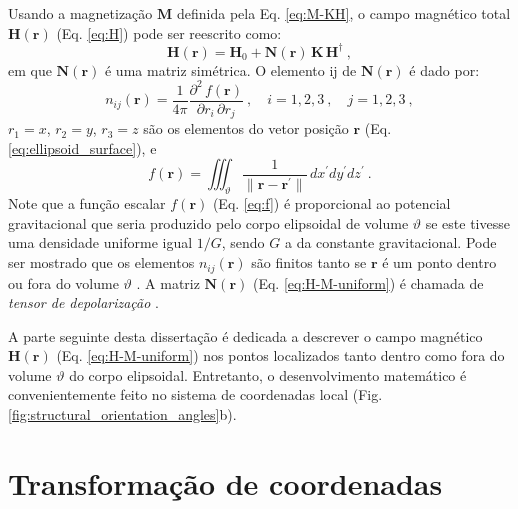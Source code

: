 Usando a magnetização $\mathbf{M}$ definida pela Eq. \ref{eq:M-KH}, o campo magnético total $\mathbf{H}(\mathbf{r})$ (Eq. \ref{eq:H}) pode ser reescrito como:
\begin{equation}
\mathbf{H}(\mathbf{r}) = \mathbf{H}_{0} 
+ \mathbf{N}(\mathbf{r}) \, \mathbf{K} \, \mathbf{H}^{\dagger} \: ,
\label{eq:H-M-uniform}
\end{equation}
em que $\mathbf{N}(\mathbf{r})$ é uma matriz simétrica. O elemento ij de $\mathbf{N}(\mathbf{r})$ é dado por:
\begin{equation}
n_{ij}(\mathbf{r}) = 
\frac{1}{4\pi} \frac{\partial^{2} \, f(\mathbf{r})}
{\partial r_{i} \, \partial r_{j}} 
\: , \quad i = 1, 2, 3 \: , 
\quad j = 1, 2, 3 \: ,
\label{eq:nij}
\end{equation}
$r_{1} = x$, $r_{2} = y$, $r_{3} = z$ são os elementos do vetor posição $\mathbf{r}$ (Eq. \ref{eq:ellipsoid_surface}), 
e
\begin{equation}
f(\mathbf{r}) = \iiint_{\vartheta} 
\frac{1}{\| \mathbf{r} - \mathbf{r}^{\prime} \|}
\, dx^{\prime}dy^{\prime}dz^{\prime} \: .
\label{eq:f}
\end{equation}
Note que a função escalar $f(\mathbf{r})$ (Eq. \ref{eq:f}) é proporcional ao potencial gravitacional que seria produzido pelo corpo elipsoidal de volume $\vartheta$ se este tivesse uma densidade uniforme igual $1/G$, sendo $G$ a da constante gravitacional. Pode ser mostrado que os elementos $n_{ij}(\mathbf{r})$ são finitos tanto se $\mathbf{r}$ é um ponto dentro ou fora do volume $\vartheta$ \citep{peirce1902, webster1904}. A matriz $\mathbf{N}(\mathbf{r})$ (Eq. \ref{eq:H-M-uniform}) é chamada de \textit{tensor de depolarização} \citep{soliverez1981, soliverez2008}.

A parte seguinte desta dissertação é dedicada a descrever o campo magnético $\mathbf{H}(\mathbf{r})$ (Eq. \ref{eq:H-M-uniform}) nos pontos localizados tanto dentro como fora do volume $\vartheta$ do corpo elipsoidal. Entretanto, o desenvolvimento matemático é convenientemente feito no sistema de coordenadas local (Fig. \ref{fig:structural_orientation_angles}b).

\section{Transformação de coordenadas}

